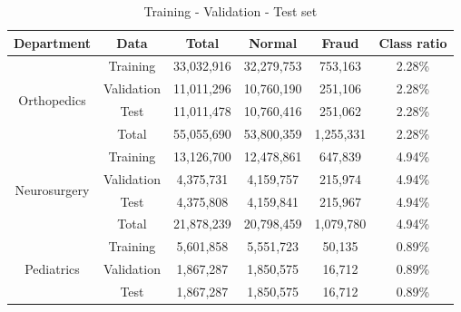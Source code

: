 \documentclass[11pt]{article}           %
\begin{document}
\begin{table}[]
    \centering
    \caption{Training - Validation - Test set}
    \vspace{0.5cm}
    \label{table: data split}
    \begin{tabular}{@{}cccccc@{}}
    \toprule
    Department                                                                         & Data       & Total      & Normal     & Fraud     & Class ratio \\ \midrule
    \multirow{4}{*}{Orthopedics}                                                       & Training   & 33,032,916 & 32,279,753 & 753,163   & 2.28\%      \\
                                                                                       & Validation & 11,011,296 & 10,760,190 & 251,106   & 2.28\%      \\
                                                                                       & Test       & 11,011,478 & 10,760,416 & 251,062   & 2.28\%      \\
                                                                                       & Total      & 55,055,690 & 53,800,359 & 1,255,331 & 2.28\%      \\ \midrule
    \multirow{4}{*}{Neurosurgery}                                                      & Training   & 13,126,700 & 12,478,861 & 647,839   & 4.94\%      \\ 
                                                                                       & Validation & 4,375,731  & 4,159,757  & 215,974   & 4.94\%      \\
                                                                                       & Test       & 4,375,808  & 4,159,841  & 215,967   & 4.94\%      \\
                                                                                       & Total      & 21,878,239 & 20,798,459 & 1,079,780 & 4.94\%      \\ \midrule
    \multirow{4}{*}{Pediatrics}                                                        & Training   & 5,601,858  & 5,551,723  & 50,135    & 0.89\%      \\ 
                                                                                       & Validation & 1,867,287  & 1,850,575  & 16,712    & 0.89\%      \\
                                                                                       & Test       & 1,867,287  & 1,850,575  & 16,712    & 0.89\%      \\

\end{tabular}
\end{table}
\end{document}

